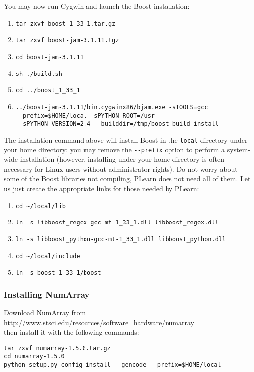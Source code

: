 \documentclass[11pt]{book}
\begin{document}
You may now run Cygwin and launch the Boost installation:
\begin{enumerate}
\item \verb!tar zxvf boost_1_33_1.tar.gz!
\item \verb!tar zxvf boost-jam-3.1.11.tgz!
\item \verb!cd boost-jam-3.1.11!
\item \verb!sh ./build.sh!
\item \verb!cd ../boost_1_33_1!
\item \verb!../boost-jam-3.1.11/bin.cygwinx86/bjam.exe -sTOOLS=gcc! \\
\verb!--prefix=$HOME/local -sPYTHON_ROOT=/usr! \\
\verb! -sPYTHON_VERSION=2.4 --builddir=/tmp/boost_build install!
\end{enumerate}

The installation command above will install Boost in the \verb!local! directory
under your home directory: you may remove the \verb!--prefix! option to perform
a system-wide installation (however, installing under your home directory is often
necessary for Linux users without administrator rights).
Do not worry about some of the Boost libraries not compiling, PLearn does not
need all of them.
Let us just create the appropriate links for those needed by PLearn:
\begin{enumerate}
\item \verb!cd ~/local/lib!
\item \verb!ln -s libboost_regex-gcc-mt-1_33_1.dll libboost_regex.dll!
\item \verb!ln -s libboost_python-gcc-mt-1_33_1.dll libboost_python.dll!
\item \verb!cd ~/local/include!
\item \verb!ln -s boost-1_33_1/boost!
\end{enumerate}

\subsubsection{Installing NumArray}

Download NumArray from \\
\url{http://www.stsci.edu/resources/software\_hardware/numarray} \\
then install it with the following commands:
\begin{verbatim}
tar zxvf numarray-1.5.0.tar.gz
cd numarray-1.5.0
python setup.py config install --gencode --prefix=$HOME/local
\end{verbatim}
\end{document}
